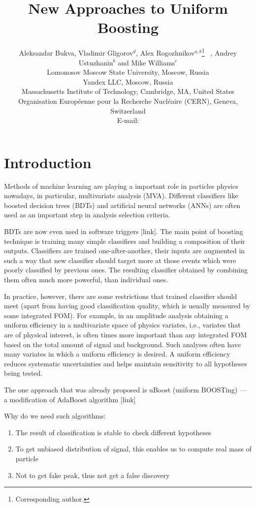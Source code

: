\documentclass{JINST}
\title{New Approaches to Uniform Boosting}
\author{
Aleksandar Bukva, 
Vladimir Gligorov$^d$,
Alex Rogozhnikov$^{a,b}$\thanks{Corresponding author.}~ ,
Andrey Ustuzhanin$^b$ and
Mike Williams$^c$\\
\llap{$^a$}Lomonosov Moscow State University, Moscow, Russia\\
\llap{$^b$}Yandex LLC, Moscow, Russia\\
\llap{$^c$}Massachusetts Institute of Technology, Cambridge, MA, United States \\
\llap{$^d$}Organisation Europ\'eenne pour la Recherche Nucl\'eaire (CERN), Geneva, Switzerland  \\
E-mail: \email{alex.rogozhnikov@yandex.ru}}
\theoremstyle{definition}
\theoremstyle{remark}
\begin{document}
\maketitle


\section{Introduction}

Methods of machine learning are playing a important role in particles physics nowadays, in particular, multivariate analysis (MVA). 
Different classifiers like boosted decision trees (BDTs) and artificial neural networks (ANNs) are often used as an important step in analysis selection criteria. 

BDTs are now even used in software triggers [link]. The main point of boosting technique is training many simple classifiers and building a composition of their outputs.
Classifiers are trained one-after-another, their inputs are augmented in such a way that new classifier should target more at those events which were poorly classified by previous ones. The resulting classifier obtained by combining them often much more powerful, than individual ones.


In practice, however, there are some restrictions that trained classifier should meet (apart from having good classification quality, which is usually measured by some integrated FOM). For example, in an amplitude analysis obtaining a uniform efficiency in a multivariate space of physics variates, i.e., variates that are of physical interest, is often times more important than any integrated FOM based on the total amount of signal and background. Such analyses often have many variates in which a uniform efficiency is desired. A uniform efficiency reduces systematic uncertainties and helps maintain sensitivity to all hypotheses being tested.

The one approach that was already proposed is uBoost (uniform BOOSTing) --- a modification of AdaBoost algorithm [link]

Why do we need such algorithms:

\begin{enumerate}
	\item The result of classification is stable to check different hypotheses
	\item To get unbiased distribution of signal, this enables us to compute real mass of particle
	\item Not to get fake peak, thus not get a false discovery
\end{enumerate}
\end{document}
